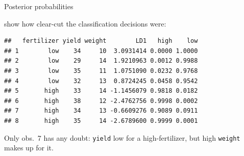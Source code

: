 \documentclass[ignorenonframetext,]{beamer}
\newenvironment{Shaded}{\begin{snugshade}}{\end{snugshade}}
\newcommand{\DecValTok}[1]{\textcolor[rgb]{0.00,0.00,0.81}{#1}}
\newcommand{\KeywordTok}[1]{\textcolor[rgb]{0.13,0.29,0.53}{\textbf{#1}}}
\newcommand{\NormalTok}[1]{#1}
\newcommand{\OperatorTok}[1]{\textcolor[rgb]{0.81,0.36,0.00}{\textbf{#1}}}
\newcommand{\StringTok}[1]{\textcolor[rgb]{0.31,0.60,0.02}{#1}}
\begin{document}
\begin{frame}[fragile]{Posterior probabilities}
\protect\hypertarget{posterior-probabilities}{}

show how clear-cut the classification decisions were:

\small

\begin{Shaded}
\end{Shaded}

\begin{verbatim}
##   fertilizer yield weight        LD1   high    low
## 1        low    34     10  3.0931414 0.0000 1.0000
## 2        low    29     14  1.9210963 0.0012 0.9988
## 3        low    35     11  1.0751090 0.0232 0.9768
## 4        low    32     13  0.8724245 0.0458 0.9542
## 5       high    33     14 -1.1456079 0.9818 0.0182
## 6       high    38     12 -2.4762756 0.9998 0.0002
## 7       high    34     13 -0.6609276 0.9089 0.0911
## 8       high    35     14 -2.6789600 0.9999 0.0001
\end{verbatim}

\normalsize

Only obs.~7 has any doubt: \texttt{yield} low for a high-fertilizer, but
high \texttt{weight} makes up for it.

\end{frame}
\end{document}
